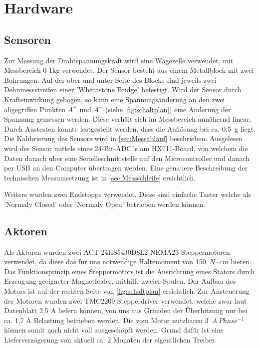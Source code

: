 \section{Hardware}
\label{sec:Hardware}

\subsection{Sensoren}

Zur Messung der Drahtspannungskraft wird eine Wägezelle verwendet, mit Messbereich 0-1kg verwendet. Der Sensor besteht aus einem Metallblock mit zwei Bohrungen. Auf der ober und unter Seite des Blocks sind jeweils zwei Dehnmessstreifen einer 'Wheatstone Bridge' befestigt. Wird der Sensor durch Krafteinwirkung gebogen, so kann eine Spannungsänderung an den zwei abgegriffen Punkten $A^+$ und $A^-$ (siehe \autoref{fig:schaltplan}) eine Änderung der Spannung gemessen werden. Diese verhält sich im Messbereich annähernd linear. Durch Austesten konnte festgestellt werden, dass die Auflösung bei ca. 0.5~g liegt. Die Kalibrierung des Sensors wird in \autoref{sec:Messablauf} beschrieben.\newline
Ausgelesen wird der Sensor mittels eines 24-Bit-ADC´s am HX711-Board, von welchem die Daten danach über eine Serielleschnittstelle auf den Microcontroller und danach per USB an den Computer übertragen werden. Eine genauere Beschreibung der technischen Messumsetzung ist in \autoref{sec:Messschleife} ersichtlich. 


Weiters wurden zwei Endstopps verwendet. Diese sind einfache Taster welche als 'Normaly Closed' oder 'Normaly Open' betrieben werden können.


\subsection{Aktoren}

Als Aktoren wurden zwei ACT 24HS5430D8L2 NEMA23 Steppermotoren verwendet, da diese das für uns notwendige Haltemoment von 150~$N \cdot cm$ bieten. Das Funktionsprinzip eines Steppermotors ist die Ausrichtung eines Stators durch Erzeugung geeigneter Magnetfelder, mithilfe zweier Spulen. Der Aufbau des Motors ist auf der rechten Seite von \autoref{fig:schaltplan} ersichtlich. \newline
Zur Ansteuerung der Motoren wurden zwei TMC2209 Stepperdriver verwendet, welche zwar laut Datenblatt 2,5 A liefern können, von uns aus Gründen der Überhitzung nur bei ca. 1,7 A Belastung betrieben werden. Die vom Motor nutzbaren 3~$A~Phase^{-1}$ können somit noch nicht voll ausgeschöpft werden. Grund dafür ist eine Lieferverzögerung von aktuell ca. 2 Monaten der eigentlichen Treiber.


